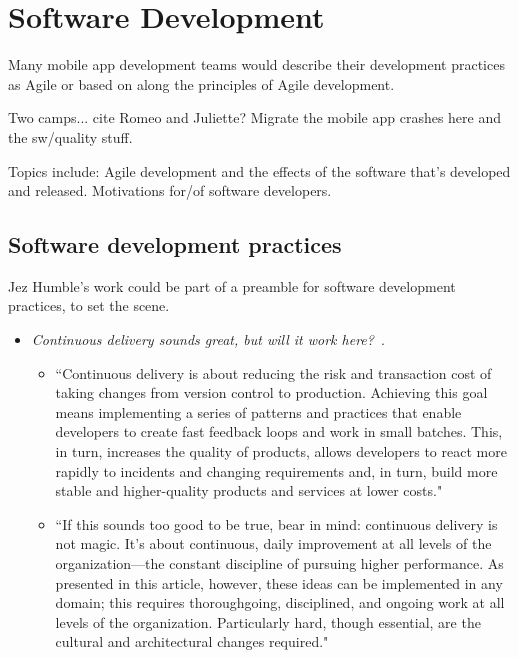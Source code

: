 \section{Software Development}
Many mobile app development teams would describe their development practices as Agile or based on along the principles of Agile development. %

Two camps... cite Romeo and Juliette? Migrate the mobile app crashes here and the sw/quality stuff.

Topics include: Agile development and the effects of the software that's developed and released. Motivations for/of software developers.

\subsection{Software development practices}
Jez Humble's work could be part of a preamble for software development practices, to set the scene.

\begin{itemize}
    \item \emph{Continuous delivery sounds great, but will it work here?}~\citep{humble2018_continuous_delivery_sounds_great}. 
    \begin{itemize}
        \item ``Continuous delivery is about reducing the risk and transaction cost of taking changes from version control to production. Achieving this goal means implementing a series of patterns and practices that enable developers to create fast feedback loops and work in small batches. This, in turn, increases the quality of products, allows developers to react more rapidly to incidents and changing requirements and, in turn, build more stable and higher-quality products and services at lower costs."
        \item ``If this sounds too good to be true, bear in mind: continuous delivery is not magic. It's about continuous, daily improvement at all levels of the organization—the constant discipline of pursuing higher performance. As presented in this article, however, these ideas can be implemented in any domain; this requires thoroughgoing, disciplined, and ongoing work at all levels of the organization. Particularly hard, though essential, are the cultural and architectural changes required."
    \end{itemize}
    
\end{itemize}

